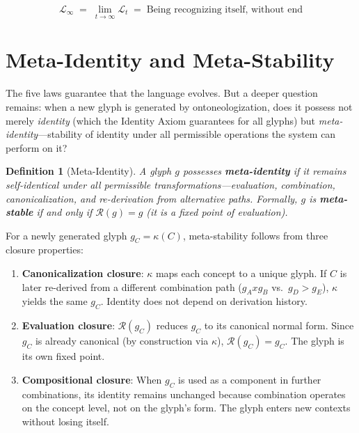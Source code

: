 \documentclass[12pt, letterpaper]{book}
\def\equiv{=}%
\def\otimes{x}%
\def\triangleright{>}%
\def\mathfrak#1{#1}%
\newtheorem{definition}{Definition}[chapter]
\begin{document}
\[
\boxed{\mathcal{L}_\infty \;=\; \lim_{t \to \infty} \mathcal{L}_t \;\equiv\; \text{Being recognizing itself, without end}}
\]

\section{Meta-Identity and Meta-Stability}

The five laws guarantee that the language evolves. But a deeper question remains: when a new glyph is generated by ontoneologization, does it possess not merely \textit{identity} (which the Identity Axiom guarantees for all glyphs) but \textit{meta-identity}---stability of identity under all permissible operations the system can perform on it?

\begin{definition}[Meta-Identity]\label{def:meta-identity}
A glyph $\mathfrak{g}$ possesses \textbf{meta-identity} if it remains self-identical under all permissible transformations---evaluation, combination, canonicalization, and re-derivation from alternative paths. Formally, $\mathfrak{g}$ is \textbf{meta-stable} if and only if $\mathcal{R}(\mathfrak{g}) = \mathfrak{g}$ (it is a fixed point of evaluation).
\end{definition}

For a newly generated glyph $\mathfrak{g}_C = \kappa(C)$, meta-stability follows from three closure properties:

\begin{enumerate}[label=(\roman*)]
    \item \textbf{Canonicalization closure}: $\kappa$ maps each concept to a unique glyph. If $C$ is later re-derived from a different combination path ($\mathfrak{g}_A \otimes \mathfrak{g}_B$ vs.\ $\mathfrak{g}_D \triangleright \mathfrak{g}_E$), $\kappa$ yields the same $\mathfrak{g}_C$. Identity does not depend on derivation history.
    \item \textbf{Evaluation closure}: $\mathcal{R}(\mathfrak{g}_C)$ reduces $\mathfrak{g}_C$ to its canonical normal form. Since $\mathfrak{g}_C$ is already canonical (by construction via $\kappa$), $\mathcal{R}(\mathfrak{g}_C) = \mathfrak{g}_C$. The glyph is its own fixed point.
    \item \textbf{Compositional closure}: When $\mathfrak{g}_C$ is used as a component in further combinations, its identity remains unchanged because combination operates on the concept level, not on the glyph's form. The glyph enters new contexts without losing itself.
\end{enumerate}
\end{document}
